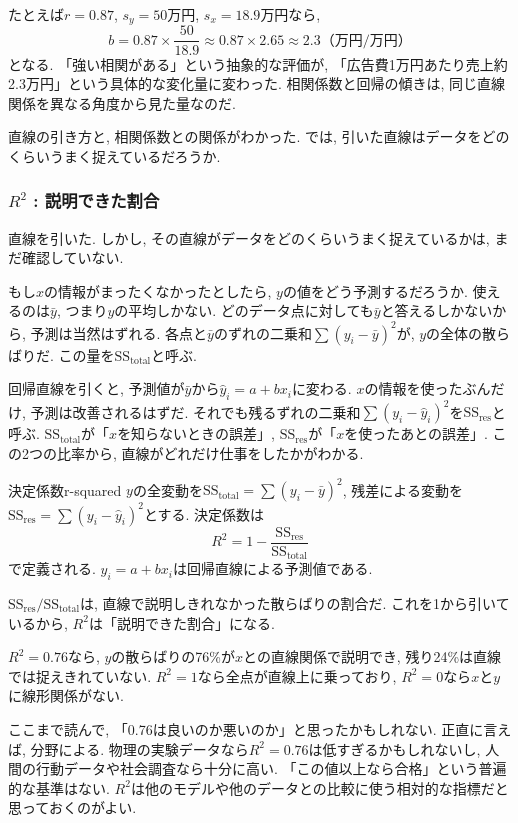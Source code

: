 たとえば$r = 0.87$, $s_y = 50$万円, $s_x = 18.9$万円なら,
\[
  b = 0.87 \times \frac{50}{18.9} \approx 0.87 \times 2.65 \approx 2.3 \text{（万円/万円）}
\]
となる.
「強い相関がある」という抽象的な評価が, 「広告費1万円あたり売上約2.3万円」という具体的な変化量に変わった.
相関係数と回帰の傾きは, 同じ直線関係を異なる角度から見た量なのだ.

直線の引き方と, 相関係数との関係がわかった.
では, 引いた直線はデータをどのくらいうまく捉えているだろうか.

\subsubsection*{$R^2$ : 説明できた割合}

直線を引いた. しかし, その直線がデータをどのくらいうまく捉えているかは, まだ確認していない.

もし$x$の情報がまったくなかったとしたら, $y$の値をどう予測するだろうか.
使えるのは$\bar{y}$, つまり$y$の平均しかない.
どのデータ点に対しても$\bar{y}$と答えるしかないから, 予測は当然はずれる.
各点と$\bar{y}$のずれの二乗和$\sum(y_i - \bar{y})^2$が, $y$の全体の散らばりだ.
この量を$\mathrm{SS_{total}}$と呼ぶ.

回帰直線を引くと, 予測値が$\bar{y}$から$\hat{y}_i = a + bx_i$に変わる.
$x$の情報を使ったぶんだけ, 予測は改善されるはずだ.
それでも残るずれの二乗和$\sum(y_i - \hat{y}_i)^2$を$\mathrm{SS_{res}}$と呼ぶ.
$\mathrm{SS_{total}}$が「$x$を知らないときの誤差」, $\mathrm{SS_{res}}$が「$x$を使ったあとの誤差」.
この2つの比率から, 直線がどれだけ仕事をしたかがわかる.

\begin{defi}{決定係数}{r-squared}
$y$の全変動を$\mathrm{SS_{total}} = \sum(y_i - \bar{y})^2$, 残差による変動を$\mathrm{SS_{res}} = \sum(y_i - \hat{y}_i)^2$とする.
決定係数は
\[
  R^2 = 1 - \frac{\mathrm{SS_{res}}}{\mathrm{SS_{total}}}
\]
で定義される. $\hat{y}_i = a + bx_i$は回帰直線による予測値である.
\end{defi}

$\mathrm{SS_{res}} / \mathrm{SS_{total}}$は, 直線で説明しきれなかった散らばりの割合だ.
これを1から引いているから, $R^2$は「説明できた割合」になる.

$R^2 = 0.76$なら, $y$の散らばりの76\%が$x$との直線関係で説明でき, 残り24\%は直線では捉えきれていない.
$R^2 = 1$なら全点が直線上に乗っており, $R^2 = 0$なら$x$と$y$に線形関係がない.

ここまで読んで, 「0.76は良いのか悪いのか」と思ったかもしれない.
正直に言えば, 分野による.
物理の実験データなら$R^2 = 0.76$は低すぎるかもしれないし, 人間の行動データや社会調査なら十分に高い.
「この値以上なら合格」という普遍的な基準はない.
$R^2$は他のモデルや他のデータとの比較に使う相対的な指標だと思っておくのがよい.

